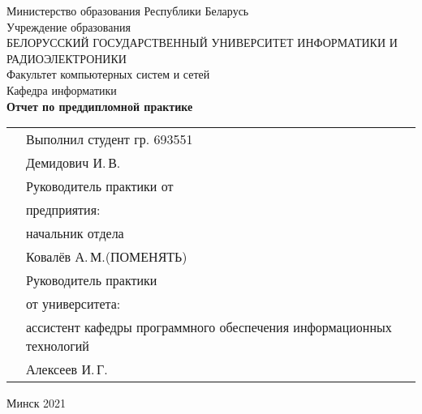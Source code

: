 \begin{titlepage}
    
    \begin{center}
        Министерство образования Республики Беларусь \\[0.4cm] 

        Учреждение образования \\

        \MakeUppercase{БЕЛОРУССКИЙ ГОСУДАРСТВЕННЫЙ УНИВЕРСИТЕТ ИНФОРМАТИКИ И РАДИОЭЛЕКТРОНИКИ} \\[0.4cm]

        Факультет компьютерных систем и сетей \\[0.4cm]

        Кафедра информатики \\[3.4cm] %

        {\large\bfseries{Отчет по преддипломной практике}} \\[2cm]

        \noindent
        \begin{tabular}{p{}p{}}
            & Выполнил студент гр. 693551 \\
            & Демидович И.\,В. \\[1cm]

            & Руководитель практики от \\
            & предприятия: \\
            & начальник отдела \\
            & Ковалёв А.\,М.(ПОМЕНЯТЬ) \\[1cm]

            & Руководитель практики \\
            & от университета: \\
            & ассистент кафедры программного обеспечения информационных технологий \\
            & Алексеев И.\,Г. \\
        \end{tabular}

        \vfill

        {\normalsize Минск 2021}
    \end{center}

\end{titlepage}
